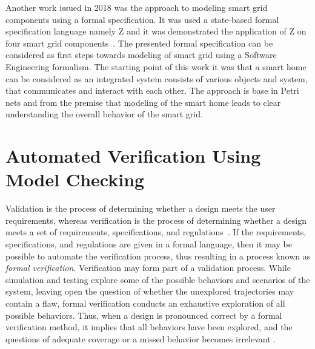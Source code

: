 \documentclass[runningheads]{llncs}
\begin{document}
Another work issued in 2018 was the approach to modeling smart grid components using a formal specification. It was used a state-based formal specification language namely Z %
and it was demonstrated the application of Z on four smart grid components~\cite{Akram2018}. The presented formal specification can be considered as first steps towards modeling of smart grid using a Software Engineering formalism. The starting point of this work it was that a smart home can be considered as an integrated system consists of various objects and system, that communicates and interact  with  each  other. The approach is base in Petri nets and from the premise that modeling of the smart home leads to clear understanding the overall behavior of the smart grid.

\section{Automated Verification Using Model Checking}
\label{sec:AutomatedVerification}
Validation is the process of determining whether a design meets the user requirements, whereas verification is the process of determining whether a design meets a set of requirements, specifications, and regulations~\cite{ClarkeHV18}. If the requirements, specifications, and regulations are given in a formal language, then it may be possible to automate the verification process, thus resulting in a process known as \textit{formal verification}. Verification may form part of a validation process.
While simulation and testing explore some of the possible behaviors and scenarios of the system, leaving open the question of whether the unexplored trajectories may contain a flaw, formal verification conducts an exhaustive exploration of all possible behaviors. Thus, when a design is pronounced correct by a formal verification method, it implies that all behaviors have been explored, and the questions of adequate coverage or a missed behavior becomes irrelevant \cite{Clarke2012}.
\end{document}

